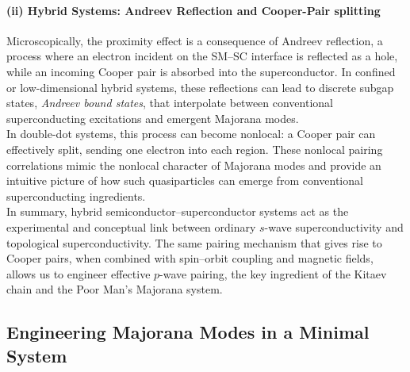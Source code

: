 \paragraph{(ii) Hybrid Systems: Andreev Reflection and Cooper-Pair splitting}
Microscopically, the proximity effect is a consequence of Andreev reflection, a process where an electron incident on the SM–SC interface is reflected as a hole, while an incoming Cooper pair is absorbed into the superconductor. In confined or low-dimensional hybrid systems, these reflections can lead to discrete subgap states, \textit{Andreev bound states}, that interpolate between conventional superconducting excitations and emergent Majorana modes.\\
In double-dot systems, this process can become nonlocal: a Cooper pair can effectively split, sending one electron into each region. These nonlocal pairing correlations mimic the nonlocal character of Majorana modes and provide an intuitive picture of how such quasiparticles can emerge from conventional superconducting ingredients.\\
In summary, hybrid semiconductor–superconductor systems act as the experimental and conceptual link between ordinary $s$-wave superconductivity and topological superconductivity. The same pairing mechanism that gives rise to Cooper pairs, when combined with spin–orbit coupling and magnetic fields, allows us to engineer effective $p$-wave pairing, the key ingredient of the Kitaev chain and the Poor Man’s Majorana system.


\subsection{Engineering Majorana Modes in a Minimal System}
